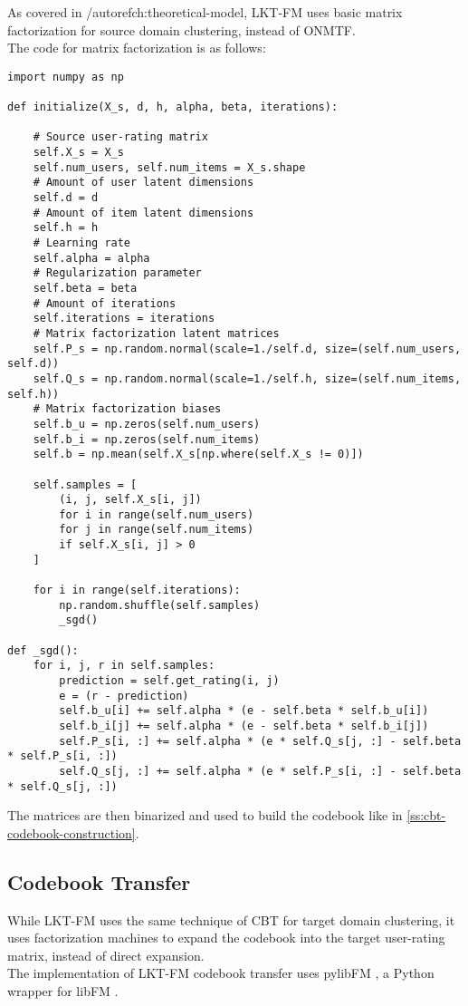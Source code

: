 As covered in /autoref{ch:theoretical-model}, LKT-FM uses basic matrix factorization for source domain clustering, instead of ONMTF.\\
The code for matrix factorization is as follows:
\begin{verbatim}
import numpy as np

def initialize(X_s, d, h, alpha, beta, iterations):

    # Source user-rating matrix
    self.X_s = X_s
    self.num_users, self.num_items = X_s.shape
    # Amount of user latent dimensions
    self.d = d
    # Amount of item latent dimensions
    self.h = h
    # Learning rate
    self.alpha = alpha
    # Regularization parameter
    self.beta = beta
    # Amount of iterations
    self.iterations = iterations
    # Matrix factorization latent matrices
    self.P_s = np.random.normal(scale=1./self.d, size=(self.num_users, self.d))
    self.Q_s = np.random.normal(scale=1./self.h, size=(self.num_items, self.h))
    # Matrix factorization biases
    self.b_u = np.zeros(self.num_users)
    self.b_i = np.zeros(self.num_items)
    self.b = np.mean(self.X_s[np.where(self.X_s != 0)])

    self.samples = [
        (i, j, self.X_s[i, j])
        for i in range(self.num_users)
        for j in range(self.num_items)
        if self.X_s[i, j] > 0
    ]

    for i in range(self.iterations):
        np.random.shuffle(self.samples)
        _sgd()

def _sgd():
    for i, j, r in self.samples:
        prediction = self.get_rating(i, j)
        e = (r - prediction)
        self.b_u[i] += self.alpha * (e - self.beta * self.b_u[i])
        self.b_i[j] += self.alpha * (e - self.beta * self.b_i[j])
        self.P_s[i, :] += self.alpha * (e * self.Q_s[j, :] - self.beta * self.P_s[i, :])
        self.Q_s[j, :] += self.alpha * (e * self.P_s[i, :] - self.beta * self.Q_s[j, :])
\end{verbatim}
The matrices are then binarized and used to build the codebook like in \autoref{ss:cbt-codebook-construction}.


\subsection{Codebook Transfer}

While LKT-FM uses the same technique of CBT for target domain clustering, it uses factorization machines to expand the codebook into the target user-rating matrix, instead of direct expansion.\\
The implementation of LKT-FM codebook transfer uses pylibFM \cite{pylibfm}, a Python wrapper for libFM \cite{10.1145/2168752.2168771, libfm}.